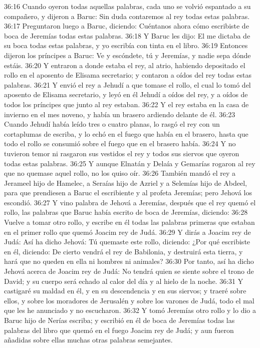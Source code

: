 36:16 Cuando oyeron todas aquellas palabras, cada uno se volvió espantado a su compañero, y dijeron a Baruc: Sin duda contaremos al rey todas estas palabras.  
36:17 Preguntaron luego a Baruc, diciendo: Cuéntanos ahora cómo escribiste de boca de Jeremías todas estas palabras.  
36:18 Y Baruc les dijo: El me dictaba de su boca todas estas palabras, y yo escribía con tinta en el libro.  
36:19 Entonces dijeron los príncipes a Baruc: Ve y escóndete, tú y Jeremías, y nadie sepa dónde estáis.  
36:20 Y entraron a donde estaba el rey, al atrio, habiendo depositado el rollo en el aposento de Elisama secretario; y contaron a oídos del rey todas estas palabras.  
36:21 Y envió el rey a Jehudí a que tomase el rollo, el cual lo tomó del aposento de Elisama secretario, y leyó en él Jehudí a oídos del rey, y a oídos de todos los príncipes que junto al rey estaban.  
36:22 Y el rey estaba en la casa de invierno en el mes noveno, y había un brasero ardiendo delante de él.  
36:23 Cuando Jehudí había leído tres o cuatro planas, lo rasgó el rey con un cortaplumas de escriba, y lo echó en el fuego que había en el brasero, hasta que todo el rollo se consumió sobre el fuego que en el brasero había.  
36:24 Y no tuvieron temor ni rasgaron sus vestidos el rey y todos sus siervos que oyeron todas estas palabras.  
36:25 Y aunque Elnatán y Delaía y Gemarías rogaron al rey que no quemase aquel rollo, no los quiso oír.  
36:26 También mandó el rey a Jerameel hijo de Hamelec, a Seraías hijo de Azriel y a Selemías hijo de Abdeel, para que prendiesen a Baruc el escribiente y al profeta Jeremías; pero Jehová los escondió.  
36:27 Y vino palabra de Jehová a Jeremías, después que el rey quemó el rollo, las palabras que Baruc había escrito de boca de Jeremías, diciendo:  
36:28 Vuelve a tomar otro rollo, y escribe en él todas las palabras primeras que estaban en el primer rollo que quemó Joacim rey de Judá.  
36:29 Y dirás a Joacim rey de Judá: Así ha dicho Jehová: Tú quemaste este rollo, diciendo: ¿Por qué escribiste en él, diciendo: De cierto vendrá el rey de Babilonia, y destruirá esta tierra, y hará que no queden en ella ni hombres ni animales?  
36:30 Por tanto, así ha dicho Jehová acerca de Joacim rey de Judá: No tendrá quien se siente sobre el trono de David; y su cuerpo será echado al calor del día y al hielo de la noche.  
36:31 Y castigaré su maldad en él, y en su descendencia y en sus siervos; y traeré sobre ellos, y sobre los moradores de Jerusalén y sobre los varones de Judá, todo el mal que les he anunciado y no escucharon.  
36:32 Y tomó Jeremías otro rollo y lo dio a Baruc hijo de Nerías escriba; y escribió en él de boca de Jeremías todas las palabras del libro que quemó en el fuego Joacim rey de Judá; y aun fueron añadidas sobre ellas muchas otras palabras semejantes.  

